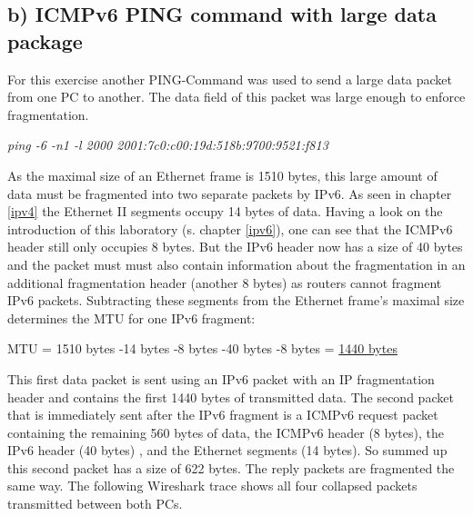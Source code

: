 \subsection{b) ICMPv6 PING command with large data package}
\label{ipv6-fragmentation}
For this exercise another PING-Command was used to send a large data packet from one PC to another. The data field of this packet was large enough to enforce fragmentation.
\begin{center}
	\textit{ping -6 -n1 -l 2000 2001:7c0:c00:19d:518b:9700:9521:f813}
\end{center}
As the maximal size of an Ethernet frame is 1510 bytes, this large amount of data must be fragmented into two separate packets by IPv6. As seen in chapter \ref{ipv4} the Ethernet II segments occupy 14 bytes of data. Having a look on the introduction of this laboratory (s. chapter \ref{ipv6}), one can see that the ICMPv6 header still only occupies 8 bytes. But the IPv6 header now has a size of 40 bytes and the packet must must also contain information about the fragmentation in an additional fragmentation header (another 8 bytes) as routers cannot fragment IPv6 packets. Subtracting these segments from the Ethernet frame's maximal size determines the MTU for one IPv6 fragment:
\begin{center}
	MTU = 1510 bytes -14 bytes -8 bytes -40 bytes -8 bytes
		= \underline{1440 bytes} 
\end{center} 
This first data packet is sent using an IPv6 packet with an IP fragmentation header and contains the first 1440 bytes of transmitted data. The second packet that is immediately sent after the IPv6 fragment is a ICMPv6 request packet containing the remaining 560 bytes of data, the ICMPv6 header (8 bytes), the IPv6 header (40 bytes) , and the Ethernet segments (14 bytes). So summed up this second packet has a size of 622 bytes. The reply packets are fragmented the same way. The following Wireshark trace shows all four collapsed packets transmitted between both PCs.
\\
